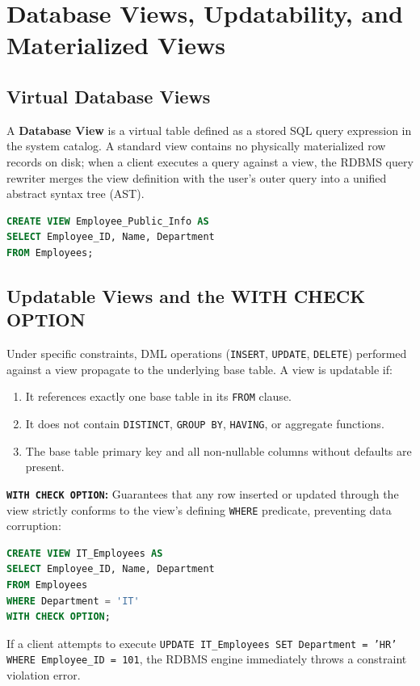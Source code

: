 \section{Database Views, Updatability, and Materialized Views}
\label{sec:dbms_views}

\subsection{Virtual Database Views}
A \textbf{Database View} is a virtual table defined as a stored SQL query expression in the system catalog. A standard view contains no physically materialized row records on disk; when a client executes a query against a view, the RDBMS query rewriter merges the view definition with the user's outer query into a unified abstract syntax tree (AST).
\begin{lstlisting}[language=SQL]
CREATE VIEW Employee_Public_Info AS
SELECT Employee_ID, Name, Department
FROM Employees;
\end{lstlisting}

\subsection{Updatable Views and the WITH CHECK OPTION}
Under specific constraints, DML operations (\texttt{INSERT}, \texttt{UPDATE}, \texttt{DELETE}) performed against a view propagate to the underlying base table. A view is updatable if:
\begin{enumerate}
    \item It references exactly one base table in its \texttt{FROM} clause.
    \item It does not contain \texttt{DISTINCT}, \texttt{GROUP BY}, \texttt{HAVING}, or aggregate functions.
    \item The base table primary key and all non-nullable columns without defaults are present.
\end{enumerate}

\textbf{\texttt{WITH CHECK OPTION}:} Guarantees that any row inserted or updated through the view strictly conforms to the view's defining \texttt{WHERE} predicate, preventing data corruption:
\begin{lstlisting}[language=SQL]
CREATE VIEW IT_Employees AS
SELECT Employee_ID, Name, Department
FROM Employees
WHERE Department = 'IT'
WITH CHECK OPTION;
\end{lstlisting}
If a client attempts to execute \texttt{UPDATE IT\_Employees SET Department = 'HR' WHERE Employee\_ID = 101}, the RDBMS engine immediately throws a constraint violation error.

